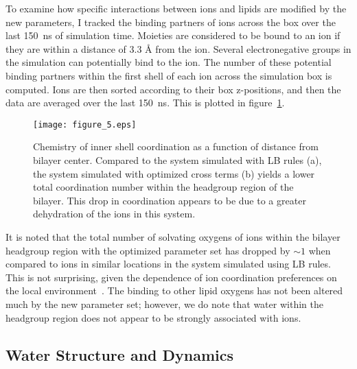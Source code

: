 To examine how specific interactions between ions and lipids are modified by the new parameters, 
I tracked the binding partners of ions across the box over the last 150~ns of simulation time. 
Moieties are considered to be bound to an ion if they are within a distance of 3.3 \AA{} from the \na{} ion. 
Several electronegative groups in the simulation can potentially bind to the \na{} ion. 
The number of these potential binding partners within the first shell of each \na{} ion
across the simulation box is computed. 
Ions are then sorted according to their box z-positions, and then the data are averaged over the last 150~ns. 
This is plotted in figure~\ref{figch2:cood}. 
\begin{figure}[H]
    \caption[\na{} inner shell coordination partners]{Chemistry of \na{} inner shell coordination as a function of distance from bilayer
center. Compared to the system simulated with LB rules (a), the system simulated with optimized cross terms (b)
        yields a lower \na{} total coordination number within the headgroup region of the bilayer. 
        This drop in coordination appears to be due to a greater dehydration of the ions in this system.}
    \label{figch2:cood}
    \texttt{[image: figure\_5.eps]}
\end{figure}
It is noted that the total number of solvating oxygens of ions within the bilayer headgroup
region with the optimized parameter set has dropped by $\sim 1$ when
compared to ions in similar locations in the system simulated using LB rules. 
This is not surprising, given the dependence of ion coordination
preferences on the local environment~\cite{varma:2008:JACS}. 
The binding to other lipid oxygens has not been altered much by the new parameter set; 
however, we do note that water within the headgroup region does not appear to be strongly associated with ions. 

\subsection{Water Structure and Dynamics}

